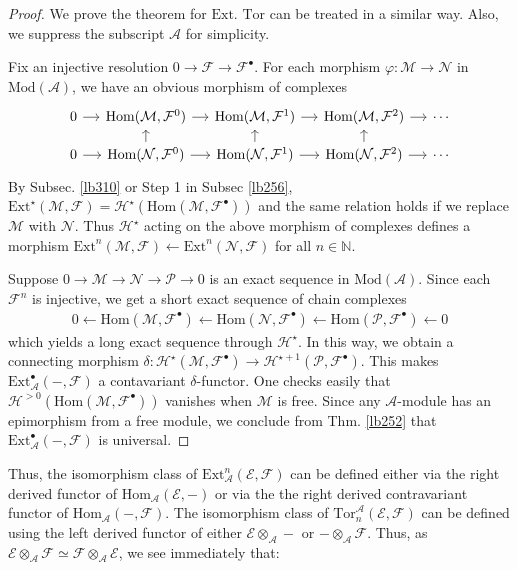 \documentclass[12pt,b5paper,notitlepage]{report}
\theoremstyle{definition}
\theoremstyle{plain}
\newcommand{\mc}{\mathcal}
\newcommand{\Hom}{\mathrm{Hom}}
\newcommand{\blt}{\bullet}
\newcommand{\Nbb}{\mathbb N}
\newcommand{\Ext}{\mathrm{Ext}}
\newcommand{\Tor}{\mathrm{Tor}}
\newcommand{\Mod}{\mathrm{Mod}}
\numberwithin{equation}{section}
\begin{document}
\begin{proof}
We prove the theorem for $\Ext$. $\Tor$ can be treated in a similar way. Also, we suppress the subscript $\mc A$ for simplicity.

Fix an injective resolution $0\rightarrow\mc F\rightarrow\mc F^\blt$. For each morphism $\varphi:\mc M\rightarrow\mc N$ in $\Mod(\mc A)$, we have an obvious morphism of complexes
\begin{equation*}
\begin{tikzcd}[sep=small]
0 \arrow[r] & {\Hom(\mc M,\mc F^0)} \arrow[r]           & {\Hom(\mc M,\mc F^1)} \arrow[r]           & {\Hom(\mc M,\mc F^2)} \arrow[r]           & \cdots \\
0 \arrow[r] & {\Hom(\mc N,\mc F^0)} \arrow[r] \arrow[u] & {\Hom(\mc N,\mc F^1)} \arrow[r] \arrow[u] & {\Hom(\mc N,\mc F^2)} \arrow[r] \arrow[u] & \cdots
\end{tikzcd}
\end{equation*}
By Subsec. \ref{lb310} or Step 1 in Subsec \ref{lb256}, $\Ext^\star(\mc M,\mc F)=\mc H^\star(\Hom(\mc M,\mc F^\blt))$ and the same relation holds if we replace $\mc M$ with $\mc N$. Thus $\mc H^\star$ acting on the above morphism of complexes defines a morphism $\Ext^n(\mc M,\mc F)\leftarrow\Ext^n(\mc N,\mc F)$ for all $n\in\Nbb$.

Suppose $0\rightarrow\mc M\rightarrow\mc N\rightarrow\mc P\rightarrow0$ is an exact sequence in $\Mod(\mc A)$. Since each $\mc F^n$ is injective, we get a short exact sequence of chain complexes
\begin{align*}
0\leftarrow \Hom(\mc M,\mc F^\blt)\leftarrow \Hom(\mc N,\mc F^\blt)\leftarrow\Hom(\mc P,\mc F^\blt)\leftarrow0
\end{align*}
which yields a long exact sequence through $\mc H^\star$. In this way, we obtain a connecting morphism $\delta:\mc H^\star(\mc M,\mc F^\blt)\rightarrow\mc H^{\star+1}(\mc P,\mc F^\blt)$. This makes $\Ext^\blt_{\mc A}(-,\mc F)$ a contavariant $\delta$-functor. One checks easily that $\mc H^{>0}(\Hom(\mc M,\mc F^\blt))$ vanishes when $\mc M$ is free. Since any $\mc A$-module has an epimorphism from a free module, we conclude from Thm. \ref{lb252} that $\Ext^\blt_{\mc A}(-,\mc F)$ is universal.
\end{proof}



Thus, the isomorphism class of $\Ext^n_{\mc A}(\mc E,\mc F)$ can be defined either via the right derived functor of $\Hom_{\mc A}(\mc E,-)$ or via the the right derived contravariant functor of $\Hom_{\mc A}(-,\mc F)$. The isomorphism class of $\Tor_n^{\mc A}(\mc E,\mc F)$ can be defined using the left derived functor of either $\mc E\otimes_{\mc A}-$ or $-\otimes_{\mc A}\mc F$. Thus, as $\mc E\otimes_{\mc A}\mc F\simeq\mc F\otimes_{\mc A}\mc E$, we see immediately that:
\end{document}
